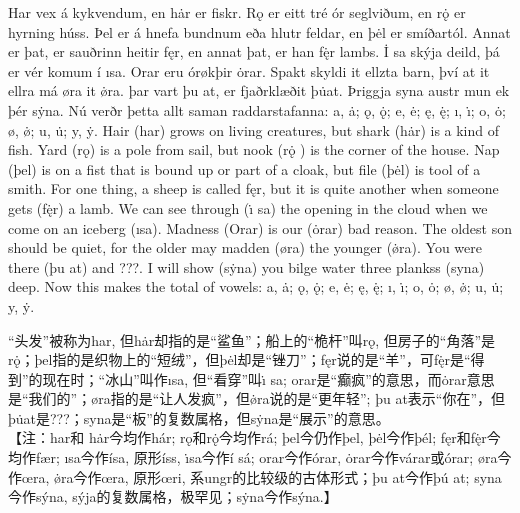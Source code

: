 \begin{paracol}{2}
    Har vex á kykvendum, en hȧr er fiskr. Rǫ er eitt tré ór seglviðum, en rǫ̇ er hyrning húss. Þel er á hnefa bundnum eða hlutr feldar, en þėl er smíðartól. Annat er þat, er sauðrinn heitir fęr, en annat þat, er han fę̇r lambs. İ sa skýja deild, þá er vér komum í ısa. Orar eru órøkþir ȯrar. Spakt skyldi it ellzta barn, því at it ellra má øra it ø̇ra. þar vart þu at, er fjaðrklæðit þu̇at\footnotemark[1]. Þriggja syna austr mun ek þér sẏna. Nú verðr þetta allt saman raddarstafanna: a, ȧ; ǫ, ǫ̇; e, ė; ę, ę̇; ı, ı̇; o, ȯ; ø, ø̇; u, u̇; y, ẏ.
    \switchcolumn
    Hair (har) grows on living creatures, but shark (hȧr) is a kind of fish. Yard (rǫ) is a pole from sail, but nook (rǫ̇ ) is the corner of the house. Nap (þel) is on a fist that is bound up or part of a cloak, but file (þėl) is tool of a smith. For one thing, a sheep is called fęr, but it is quite another when someone gets (fę̇r) a lamb. We can see through (ı̇ sa) the opening in the cloud when we come on an iceberg (ısa). Madness (Orar) is our (ȯrar) bad reason. The oldest son should be quiet, for the older may madden (øra) the younger (ø̇ra). You were there (þu at) and ???. I will show (sẏna) you bilge water three plankss (syna) deep. Now this makes the total of vowels: a, ȧ; ǫ, ǫ̇; e, ė; ę, ę̇; ı, ı̇; o, ȯ; ø, ø̇; u, u̇; y, ẏ.
\end{paracol}
\begin{translation*}{}
    “头发”被称为har, 但hȧr却指的是“鲨鱼”；船上的“桅杆”叫rǫ, 但房子的“角落”是rǫ̇；þel指的是织物上的“短绒”，但þėl却是“锉刀”；fęr说的是“羊”，可fę̇r是“得到”的现在时；“冰山”叫作ısa, 但“看穿”叫ı̇ sa; orar是“癫疯”的意思，而ȯrar意思是“我们的”；øra指的是“让人发疯”，但ø̇ra说的是“更年轻”; þu at表示“你在”，但þu̇at是???；syna是“板”的复数属格，但sẏna是“展示”的意思。\\

    【注：har和 h\.{a}r今均作hár; rǫ和r\.{ǫ}今均作rá; þel今仍作þel, þ\.{e}l今作þél; fęr和f\.{ę}r今均作fær; ısa今作ísa, 原形íss, \.{ı}sa今作í sá; orar今作órar, \.{o}rar今作várar或órar; øra今作œra, \.{ø}ra今作œra, 原形œri, 系ungr的比较级的古体形式；þu at今作þú at; syna今作sýna, sýja的复数属格，极罕见；s\.{y}na今作sýna.】
\end{translation*}
